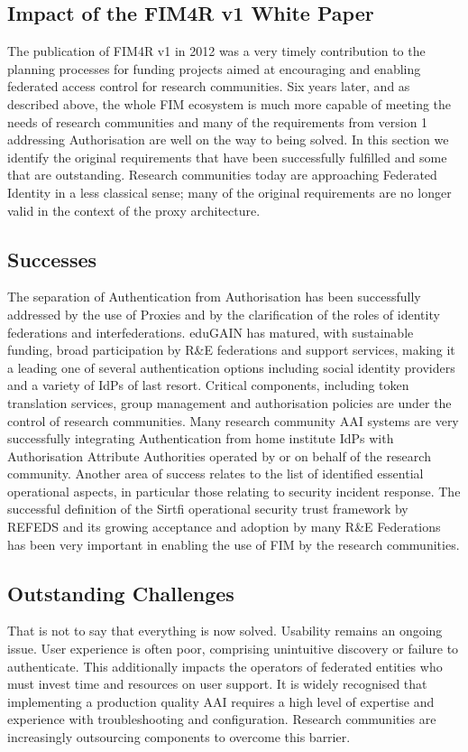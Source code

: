 \documentclass[fleqn,11pt]{wlscirep}
\begin{document}
{\subsection{Impact of the FIM4R v1 White Paper}
The publication of FIM4R v1 in 2012 was a very timely contribution to the planning processes for funding projects aimed at encouraging and enabling federated access control for research communities. Six years later, and as described above, the whole FIM ecosystem is much more capable of meeting the needs of research communities and many of the requirements from version 1 addressing Authorisation are well on the way to being solved. In this section we identify the original requirements that have been successfully fulfilled and some that are outstanding. Research communities today are approaching Federated Identity in a less classical sense; many of the original requirements are no longer valid in the context of the proxy architecture.

\subsection{Successes} 
The separation of Authentication from Authorisation has been successfully addressed by the use of Proxies and by the clarification of the roles of identity federations and interfederations. eduGAIN has matured, with sustainable funding, broad participation by R\&E federations and support services, making it a leading one of several authentication options including social identity providers and a variety of IdPs of last resort. Critical components, including token translation services, group management and authorisation policies are under the control of research communities. Many research community AAI systems are very successfully integrating Authentication from home institute IdPs with Authorisation Attribute Authorities operated by or on behalf of the research community. Another area of success relates to the list of identified essential operational aspects, in particular those relating to security incident response. The successful definition of the Sirtfi operational security trust framework by REFEDS and its growing acceptance and adoption by many R\&E Federations has been very important in enabling the use of FIM by the research communities.

\subsection{Outstanding Challenges}
That is not to say that everything is now solved. Usability remains an ongoing issue. User experience is often poor, comprising unintuitive discovery or failure to authenticate. This additionally impacts the operators of federated entities who must invest time and resources on user support. It is widely recognised that implementing a production quality AAI requires a high level of expertise and experience with troubleshooting and configuration. Research communities are increasingly outsourcing components to overcome this barrier.

}
\end{document}
